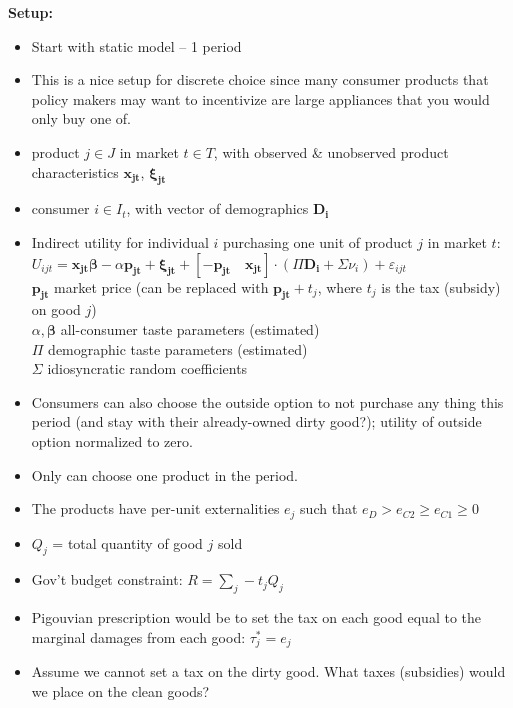 \documentclass[12pt]{article}
\begin{document}
\def\D{\boldsymbol{D_i}}
\def\x{\boldsymbol{x_{jt}}}
\def\p{\boldsymbol{p_{jt}}}
\def\c{\boldsymbol{\xi_{jt}}}
\def\U{U_{ijt}}
\def\b{\boldsymbol{\beta}}
\def\sumi{\sum\limits_i} 
\def\sumj{\sum\limits_j}
\def\sumk{\sum\limits_k}
\textbf{Setup:}
\begin{itemize}
    \item Start with static model -- 1 period
    \item This is a nice setup for discrete choice since many consumer products that policy makers may want to incentivize are large appliances that you would only buy one of.
    \item product $j\in J$ in market $t\in T$, with observed \& unobserved product characteristics $\x$, $\c$
    \item consumer $i\in I_t$, with vector of demographics $\D$
    \item Indirect utility for individual $i$ purchasing one unit of product $j$ in market $t$:\\
    $\U=\x\b  - \alpha\p +\c+ [-\p\quad \x]\cdot(\Pi \D +\Sigma\nu_i) + \varepsilon_{ijt}$\\
    $\p$ market price (can be replaced with $\p +t_j$, where $t_j$ is the tax (subsidy) on good $j$) \\
    $\alpha, \b$ all-consumer taste parameters (estimated) \\
    $\Pi$ demographic taste parameters (estimated)\\
    $\Sigma$ idiosyncratic random coefficients
    \item Consumers can also choose the outside option to not purchase any thing this period (and stay with their already-owned dirty good?); utility of outside option normalized to zero.
    \item Only can choose one product in the period.
    \item The products have per-unit externalities $e_j$ such that 
    $e_D > e_{C2} \geq e_{C1} \geq0 $
    \item $Q_j$ = total quantity of good $j$ sold
    \item Gov't budget constraint: $R=\sum_j -t_j Q_j$
    \item Pigouvian prescription would be to set the tax on each good equal to the marginal damages from each good: $\tau_j^*=e_j$
    \item Assume we cannot set a tax on the dirty good. What taxes (subsidies) would we place on the clean goods?
\end{itemize}
\end{document}

